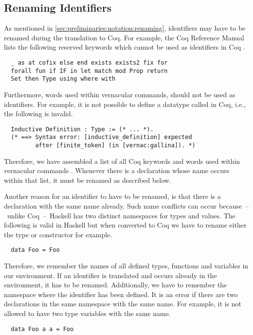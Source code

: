 \subsection{Renaming Identifiers} \label{sec:implementation:conversion:renaming}
As mentioned in \autoref{sec:preliminaries:notation:renaming}, identifiers may have to be renamed during the translation to Coq.
For example, the Coq Reference Manual lists the following reserved keywords which cannot be used as identifiers in Coq \cite[p.~24]{CoqDevTeam:2018}.
\begin{verbatim}
  _ as at cofix else end exists exists2 fix for
  forall fun if IF in let match mod Prop return
  Set then Type using where with
\end{verbatim}
Furthermore, words used within vernacular commands, should not be used as identifiers.
For example, it is not possible to define a datatype called  in Coq, i.e., the following is invalid.
\begin{verbatim}
  Inductive Definition : Type := (* ... *).
  (* ==> Syntax error: [inductive_definition] expected
         after [finite_token] (in [vernac:gallina]). *)
\end{verbatim}
Therefore, we have assembled a list of all Coq keywords and words used within vernacular commands \cite[pp.~484-487]{CoqDevTeam:2018}.
Whenever there is a declaration whose name occurs within that list, it must be renamed as described below.

Another reason for an identifier to have to be renamed, is that there is a declaration with the same name already.
Such name conflicts can occur because~--~unlike Coq~--~Haskell has two distinct namespaces for types and values.
The following is valid in Haskell but when converted to Coq we have to rename either the type or constructor for example.
\begin{verbatim}
  data Foo = Foo
\end{verbatim}
Therefore, we remember the names of all defined types, functions and variables in our environment.
If an identifier is translated and occurs already in the environment, it has to be renamed.
Additionally, we have to remember the namespace where the identifier has been defined.
It is an error if there are two declarations in the same namespace with the same name.
For example, it is not allowed to have two type variables with the same name.
\begin{verbatim}
  data Foo a a = Foo
\end{verbatim}

